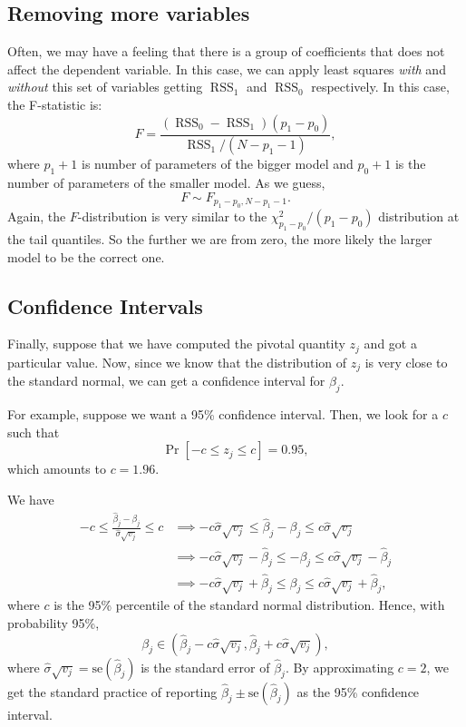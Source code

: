 \documentclass[11pt]{article}
\theoremstyle{definition}
\DeclareMathOperator*{\RSS}{RSS} \DeclareMathOperator*{\WRSS}{WRSS}
\begin{document}
\subsection{Removing more variables}
Often, we may have a feeling that there is a group of coefficients that does not
affect the dependent variable. In this case, we can apply least squares
\emph{with} and \emph{without} this set of variables getting $\RSS_1$ and 
$\RSS_0$ respectively. In this case, the F-statistic is:
\[F=\frac{(\RSS_0-\RSS_1)(p_1-p_0)}{\RSS_1/(N-p_1-1)},\] where $p_1+1$ is number
of parameters of the bigger model and $p_0+1$ is the number of parameters of the
smaller model. As we guess,
\[F\sim F_{p_1-p_0,N-p_1-1}.\] Again, the $F$-distribution is very similar to
the $\chi^2_{p_1-p_0}/(p_1-p_0)$ distribution at the tail quantiles. So the
further we are from zero, the more likely the larger model to be the correct
one.

\subsection{Confidence Intervals}
Finally, suppose that we have computed the pivotal quantity $z_j$ and got a
particular value. Now, since we know that the distribution of $z_j$ is very
close to the standard normal, we can get a confidence interval for $\beta_j$.

For example, suppose we want a 95\% confidence interval. Then, we look for a $c$
such that
\[\Pr[-c\le z_j\le c]=0.95,\]
which amounts to $c=1.96.$

We have
\begin{equation}
	\begin{split}
		-c\le \frac{\hat\beta_j-\beta_j}{\hat\sigma\sqrt{v_j}}\le c &\implies
		-c\hat\sigma\sqrt{v_j} \le \hat\beta_j-\beta_j \le c\hat\sigma\sqrt{v_j} \\
		&\implies -c\hat\sigma\sqrt{v_j}-\hat\beta_j \le -\beta_j \le c\hat\sigma\sqrt{v_j}-\hat\beta_j \\
		&\implies -c\hat\sigma\sqrt{v_j}+\hat\beta_j \le \beta_j \le c\hat\sigma\sqrt{v_j}+\hat\beta_j,
	\end{split}
\end{equation}
where $c$ is the 95\% percentile of the standard normal distribution. Hence,
with probability 95\%,
\[\beta_j\in
(\hat\beta_j-c\hat\sigma\sqrt{v_j},\hat\beta_j+c\hat\sigma\sqrt{v_j}),\] where
$\hat\sigma\sqrt{v_j}=\mathrm{se}(\hat\beta_j)$ is the standard error of
$\hat\beta_j$. By approximating $c=2$, we get the standard practice of reporting
$\hat\beta_j\pm \mathrm{se}(\hat\beta_j)$ as the 95\% confidence interval.
\end{document}
